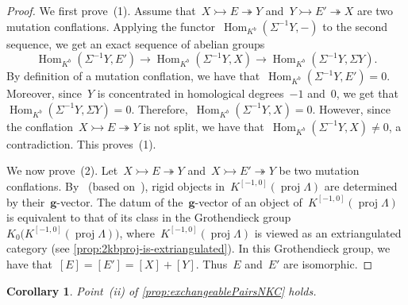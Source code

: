 \documentclass{amsart}
\newtheorem{corollary}[theorem]{Corollary}
\theoremstyle{definition}
\renewcommand{\b}[1]{{\boldsymbol{#1}}} %
\newcommand{\Hom}[1]{\operatorname{Hom}_{#1}}
\newcommand{\susp}{\Sigma}
\newcommand{\proj}{\operatorname{proj}}
\newcommand{\infl}{\rightarrowtail}
\newcommand{\defl}{\twoheadrightarrow}
\begin{document}
\begin{proof}
We first prove~(1). Assume that~$X\infl E\defl Y$ and~$Y\infl E'\defl X$ are two mutation conflations. Applying the functor~$\Hom{K^b}(\susp^{-1} Y, -)$ to the second sequence, we get an exact sequence of abelian groups
\[
\Hom{K^b}(\susp^{-1} Y, E') \to \Hom{K^b}(\susp^{-1} Y, X) \to \Hom{K^b}(\susp^{-1} Y, \susp Y).
\]
By definition of a mutation conflation, we have that~$\Hom{K^b}(\susp^{-1} Y, E') = 0$. Moreover, since~$Y$ is concentrated in homological degrees~$-1$ and~$0$, we get that~$\Hom{K^b}(\susp^{-1} Y, \susp Y) = 0$. Therefore,~$\Hom{K^b}(\susp^{-1} Y, X) = 0$. 
However, since the conflation~$X\infl E\defl Y$ is not split, we have that~$\Hom{K^b}(\susp^{-1} Y, X) \neq 0$, a contradiction. This proves~(1). 

\smallskip
We now prove~(2). Let~$X\infl E\defl Y$ and~$X\infl E'\defl Y$ be two mutation conflations. By~\cite[Thm.~6.5]{DemonetIyamaJasso} (based on~\cite[Thm~2.3]{DehyKeller}), rigid objects in~$K^{[-1,0]}(\proj \Lambda)$ are determined by their~$\b{g}$-vector. The datum of the~$\b{g}$-vector of an object of~$K^{[-1,0]}(\proj \Lambda)$ is equivalent to that of its class in the Grothendieck group~$K_0 \big( K^{[-1,0]}(\proj \Lambda) \big)$, where~$K^{[-1,0]}(\proj \Lambda)$ is viewed as an extriangulated category (see \cref{prop:2kbproj-is-extriangulated}). In this Grothendieck group, we have that~$[E] = [E'] = [X]+[Y]$. Thus~$E$ and~$E'$ are isomorphic.
\end{proof}

\begin{corollary}
\label{coro:exchangeablePairsNKC}
Point~(ii) of \cref{prop:exchangeablePairsNKC} holds.
\end{corollary}
\end{document}
